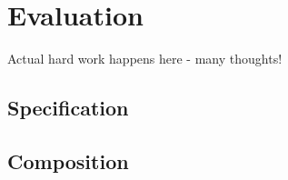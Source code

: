 \section{Evaluation}
Actual hard work happens here - many thoughts!

\subsection{Specification}

\subsection{Composition}
